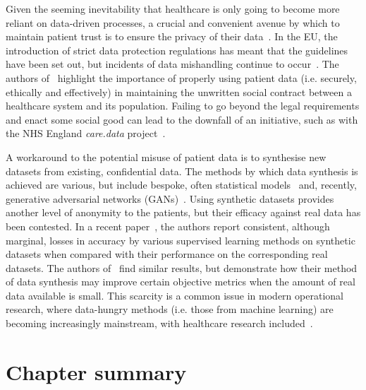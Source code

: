 Given the seeming inevitability that healthcare is only going to become more
reliant on data-driven processes, a crucial and convenient avenue by which to
maintain patient trust is to ensure the privacy of their
data~\cite{Iott2019,vanStaa2016}. In the EU, the introduction of strict data
protection regulations has meant that the guidelines have been set out, but
incidents of data mishandling continue to occur~\cite{bbc2017,edpb2020}. The
authors of~\cite{Horn2020} highlight the importance of properly using patient
data (i.e. securely, ethically and effectively) in maintaining the unwritten
social contract between a healthcare system and its population. Failing to go
beyond the legal requirements and enact some social good can lead to the
downfall of an initiative, such as with the NHS England \emph{care.data}
project~\cite{Carter2015}.

A workaround to the potential misuse of patient data is to synthesise new
datasets from existing, confidential data. The methods by which data synthesis
is achieved are various, but include bespoke, often statistical
models~\cite{Dahmen2019,Dube2014,McLachlan2016,Tucker2020} and, recently,
generative adversarial networks (GANs)~\cite{Avino2018,Torfi2020}. Using
synthetic datasets provides another level of anonymity to the patients, but
their efficacy against real data has been contested. In a recent
paper~\cite{Rankin2020}, the authors report consistent, although marginal,
losses in accuracy by various supervised learning methods on synthetic datasets
when compared with their performance on the corresponding real datasets. The
authors of~\cite{Dahmen2019} find similar results, but demonstrate how their
method of data synthesis may improve certain objective metrics when the amount
of real data available is small. This scarcity is a common issue in modern
operational research, where data-hungry methods (i.e. those from machine
learning) are becoming increasingly mainstream, with healthcare research
included~\cite{Panch2019}.

\section{Chapter summary}

